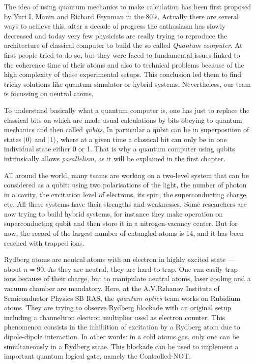 \documentclass[twoside, open=right
]{scrreprt}
\newcommand{\g}{\ensuremath{\ket{0}}\xspace}
\newcommand{\e}{\ensuremath{\ket{1}}\xspace}
\begin{document}
\par The idea of using quantum mechanics to make calculation has been first proposed by Yuri I. Manin and Richard Feynman in the 80's. Actually there are several ways to achieve this, after a decade of progress the enthusiasm has slowly decreased and today very few physicists are really trying to reproduce the architecture of classical computer to build the so called \emph{Quantum computer}. At first people tried to do so, but they were faced to fundamental issues linked to the coherence time of their atoms and also to technical problems because of the high complexity of these experimental setups. This conclusion led them to find tricky solutions like quantum simulator or hybrid systems. Nevertheless, our team is focussing on neutral atoms.

\par To understand basically what a quantum computer is, one has just to replace the classical bits on which are made usual calculations by bits obeying to quantum mechanics and then called \emph{qubits}. In particular a qubit can be in superposition of states \g and \e, where at a given time a classical bit can only be in one individual state either 0 or 1. That is why a quantum computer using qubits intrinsically allows \emph{parallelism}, as it will be explained in the first chapter.

\par All around the world, many teams are working on a two-level system that can be considered as a qubit: using two polarisations of the light, the number of photon in a cavity, the excitation level of electrons, its spin, the superconducting charge, etc. All these systems have their strengths and weaknesses. Some researchers are now trying to build hybrid systems, for instance they make operation on superconducting qubit and then store it in a nitrogen-vacancy center. But for now, the record of the largest number of entangled atoms is 14, and it has been reached with trapped ions.

\par Rydberg atoms are neutral atoms with an electron in highly excited state --- about $n=90$. As they are neutral, they are hard to trap. One can easily trap ions because of their charge, but to manipulate neutral atoms, laser cooling and a vacuum chamber are mandatory. Here, at the A.V.Rzhanov Institute of Semiconductor Physics SB RAS, the \emph{quantum optics} team works on Rubidium atoms. They are trying to observe Rydberg blockade with an original setup including a channeltron electron multiplier used as electron counter. This phenomenon consists in the inhibition of excitation by a Rydberg atom due to dipole-dipole interaction. In other words: in a cold atoms gas, only one can be simultaneously in a Rydberg state. This blockade can be used to implement a important quantum logical gate, namely the Controlled-NOT.
\end{document}

